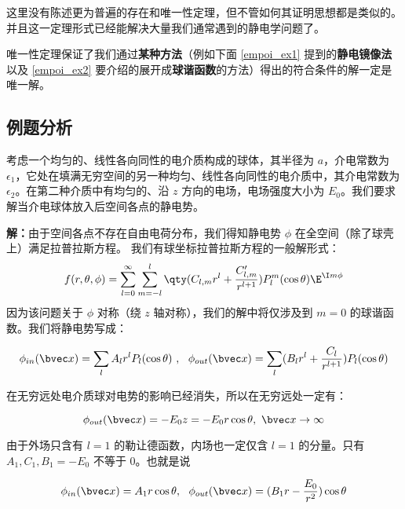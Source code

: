 这里没有陈述更为普遍的存在和唯一性定理，但不管如何其证明思想都是类似的。并且这一定理形式已经能解决大量我们通常遇到的静电学问题了。

唯一性定理保证了我们通过\textbf{某种方法}（例如下面 \autoref{empoi_ex1} 提到的\textbf{静电镜像法}以及 \autoref{empoi_ex2} 要介绍的展开成\textbf{球谐函数}的方法）得出的符合条件的解一定是唯一解。
\subsection{例题分析}
\begin{example}{}\label{empoi_ex2}
考虑一个均匀的、线性各向同性的电介质构成的球体，其半径为 $a$，介电常数为 $\epsilon_1$，它处在填满无穷空间的另一种均匀、线性各向同性的电介质中，其介电常数为 $\epsilon_2$。在第二种介质中有均匀的、沿 $z$ 方向的电场，电场强度大小为 $E_0$。我们要求解当介电球体放入后空间各点的静电势。

\end{example}

\textbf{解：}由于空间各点不存在自由电荷分布，我们得知静电势 $\phi$ 在全空间（除了球壳上）满足拉普拉斯方程。
我们有球坐标拉普拉斯方程的一般解形式：
\begin{equation}\label{empoi_eq2}
f(r, \theta, \phi) = \sum_{l = 0}^\infty \sum_{m = -l}^l \qty(C_{l,m} r^l + \frac{C'_{l,m}}{r^{l+1}})P_l^m(\cos\theta)\E^{\I m\phi}
\end{equation}
因为该问题关于 $\phi$ 对称（绕 $z$ 轴对称），我们的解中将仅涉及到 $m=0$ 的球谐函数。我们将静电势写成：

\begin{equation}
\phi_{in}(\bvec x)=\sum_{l}A_lr^lP_l(\cos \theta)\ ,\ \ \phi_{out}(\bvec x)=\sum_{l}(B_lr^l+\frac{C_l}{r^{l+1}})P_l(\cos \theta)
\end{equation}

在无穷远处电介质球对电势的影响已经消失，所以在无穷远处一定有：

\begin{equation}
\phi_{out}(\bvec x)=-E_0z=-E_0r\cos\theta,\ \bvec x\rightarrow \infty
\end{equation}

由于外场只含有 $l=1$ 的勒让德函数，内场也一定仅含 $l=1$ 的分量。只有 $A_1,C_1,B_1=-E_0$ 不等于 $0$。也就是说

\begin{equation}
\phi_{in}(\bvec x)=A_1r\cos \theta,\ \
\phi_{out}(\bvec x)=(B_1r-\frac{E_0}{r^{2}})\cos\theta
\end{equation}

